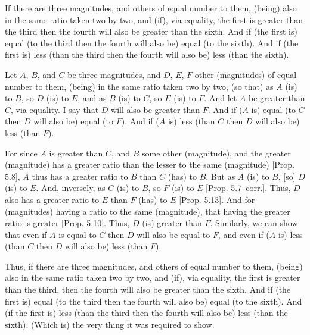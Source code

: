 \begin{Parallel}{}{}
{If there are three magnitudes, and others of equal
 number to them,   (being) also in the same ratio taken two by two, and (if),
via equality,  the first is greater
than the third then the fourth will also be greater than the sixth. And
 if (the first is) equal (to the third then the fourth will also be) equal
(to the sixth). 
And if (the first is) less (than the third then the fourth will also be) less (than
the sixth).

\epsfysize=0.7in
\centerline{}

Let $A$, $B$, and $C$ be three magnitudes, and $D$, $E$, $F$ other (magnitudes) of equal
number to them, (being) in the same ratio taken two by two, (so that)
as $A$ (is) to $B$, so $D$ (is) to $E$, and as $B$ (is) to $C$, so $E$ (is) to $F$. And let $A$
be greater than $C$, via equality. I say that $D$ will also be greater
than $F$. And if ($A$ is) equal (to $C$ then $D$ will also be) equal (to $F$). And
if ($A$ is) less (than $C$ then $D$ will also be) less (than $F$).

For since $A$ is greater than $C$, and $B$ some other (magnitude), and
the greater (magnitude) has a greater ratio than the lesser to the same (magnitude) [Prop. 5.8], $A$ thus has
a greater ratio to $B$ than $C$ (has) to $B$. But as $A$ (is) to $B$, [so] $D$ (is)
to $E$. And, inversely, as $C$ (is) to $B$,  so  $F$ (is) to $E$ [Prop. 5.7~corr.]. Thus, $D$ also has a greater
ratio to $E$ than $F$ (has) to $E$ [Prop. 5.13]. And for (magnitudes) having a ratio to the
same (magnitude), that having the greater ratio is greater [Prop. 5.10]. Thus, $D$ (is) greater than $F$.
Similarly, we can show that even if $A$ is equal to $C$ then $D$ will also
be equal to $F$, and even if ($A$ is) less (than $C$ then $D$ will also
be) less (than $F$).

Thus, if there are three magnitudes, and others of equal
number to them,   (being) also in the same ratio taken two by two, and (if),
via equality, the first is greater
than the third, then the fourth will also be greater than the sixth. And
 if (the first is) equal (to the third then the fourth will also be) equal
(to the sixth). And (if the first is) less (than the third then the fourth will also be) less (than
the sixth). (Which is) the very thing it was required to show.}
\end{Parallel}


\vspace{7pt}{\footnotesize \noindent$^\dag$ In modern notation, this proposition
reads that if $\alpha:\beta::\delta:\epsilon$ and $\beta:\gamma::\epsilon:\zeta$ then $\alpha\gtreqqless\gamma$ as $\delta\gtreqqless\zeta$.}

